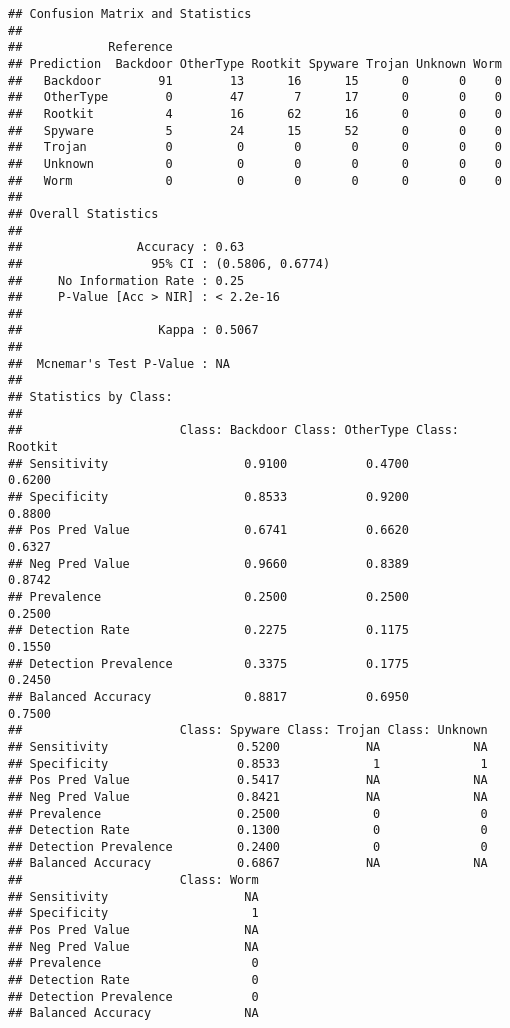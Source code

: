 \documentclass[]{article}
\begin{document}
\begin{verbatim}
## Confusion Matrix and Statistics
## 
##            Reference
## Prediction  Backdoor OtherType Rootkit Spyware Trojan Unknown Worm
##   Backdoor        91        13      16      15      0       0    0
##   OtherType        0        47       7      17      0       0    0
##   Rootkit          4        16      62      16      0       0    0
##   Spyware          5        24      15      52      0       0    0
##   Trojan           0         0       0       0      0       0    0
##   Unknown          0         0       0       0      0       0    0
##   Worm             0         0       0       0      0       0    0
## 
## Overall Statistics
##                                           
##                Accuracy : 0.63            
##                  95% CI : (0.5806, 0.6774)
##     No Information Rate : 0.25            
##     P-Value [Acc > NIR] : < 2.2e-16       
##                                           
##                   Kappa : 0.5067          
##                                           
##  Mcnemar's Test P-Value : NA              
## 
## Statistics by Class:
## 
##                      Class: Backdoor Class: OtherType Class: Rootkit
## Sensitivity                   0.9100           0.4700         0.6200
## Specificity                   0.8533           0.9200         0.8800
## Pos Pred Value                0.6741           0.6620         0.6327
## Neg Pred Value                0.9660           0.8389         0.8742
## Prevalence                    0.2500           0.2500         0.2500
## Detection Rate                0.2275           0.1175         0.1550
## Detection Prevalence          0.3375           0.1775         0.2450
## Balanced Accuracy             0.8817           0.6950         0.7500
##                      Class: Spyware Class: Trojan Class: Unknown
## Sensitivity                  0.5200            NA             NA
## Specificity                  0.8533             1              1
## Pos Pred Value               0.5417            NA             NA
## Neg Pred Value               0.8421            NA             NA
## Prevalence                   0.2500             0              0
## Detection Rate               0.1300             0              0
## Detection Prevalence         0.2400             0              0
## Balanced Accuracy            0.6867            NA             NA
##                      Class: Worm
## Sensitivity                   NA
## Specificity                    1
## Pos Pred Value                NA
## Neg Pred Value                NA
## Prevalence                     0
## Detection Rate                 0
## Detection Prevalence           0
## Balanced Accuracy             NA
\end{verbatim}
\end{document}

